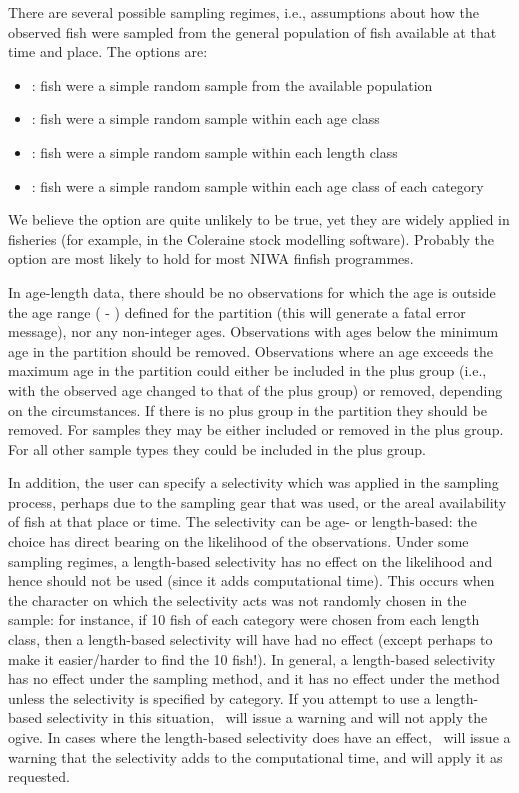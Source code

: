 There are several possible sampling regimes, i.e., assumptions about how the observed fish were sampled from the general population of fish available at that time and place. The options are: 
\begin{itemize}
	\item {}: fish were a simple random sample from the available population
	\item {}: fish were a simple random sample within each age class 
	\item {}: fish were a simple random sample within each length class
	\item {}: fish were a simple random sample within each age class of each category
\end{itemize}
We believe the  option are quite unlikely to be true, yet they are widely applied in fisheries (for example, in the Coleraine \citep{hilborn2001coleraine} stock modelling software). Probably the  option are most likely to hold for most NIWA finfish programmes.

In age-length data, there should be no observations for which the age is outside the age range ( - ) defined for the partition (this will generate a fatal error message), nor any non-integer ages. Observations with ages below the minimum age in the partition should be removed. Observations where an age exceeds the maximum age in the partition could either be included in the plus group (i.e., with the observed age changed to that of the plus group) or removed, depending on the circumstances. If there is no plus group in the partition they should be removed. For  samples they may be either included or removed in the plus group. For all other sample types they could be included in the plus group.

In addition, the user can specify a selectivity which was applied in the sampling process, perhaps due to the sampling gear that was used, or the areal availability of fish at that place or time. The selectivity can be age- or length-based: the choice has direct bearing on the likelihood of the observations. Under some sampling regimes, a length-based selectivity has no effect on the likelihood and hence should not be used (since it adds computational time). This occurs when the character on which the selectivity acts was not randomly chosen in the sample: for instance, if 10 fish of each category were chosen from each length class, then a length-based selectivity will have had no effect (except perhaps to make it easier/harder to find the 10 fish!). In general, a length-based selectivity has no effect under the  sampling method, and it has no effect under the  method unless the selectivity is specified by category. If you attempt to use a length-based selectivity in this situation, \CNAME\ will issue a warning and will not apply the ogive. In cases where the length-based selectivity does have an effect, \CNAME\ will issue a warning that the selectivity adds to the computational time, and will apply it as requested.

